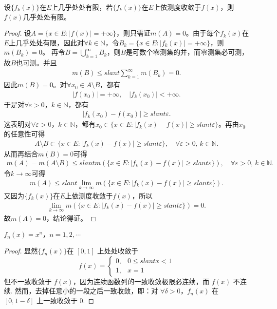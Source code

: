 \documentclass[../../main.tex]{subfiles}
\begin{document}
\begin{theorem}\label{theorem:依测度收敛的极限函数必几乎处处有限}
设\(\{f_k(x)\}\)在\(E\)上几乎处处有限，若\(\{f_k(x)\}\)在\(E\)上依测度收敛于\(f(x)\)，则\(f(x)\)几乎处处有限。
\end{theorem}
\begin{proof}
设\(A = \{x \in E : |f(x)| = +\infty\}\)，则只需证\(m(A) = 0\)。由于每个\(f_k(x)\)在\(E\)上几乎处处有限，因此对\(\forall k \in \mathbb{N}\)，令\(B_k = \{x \in E : |f_k(x)| = +\infty\}\)，则\(m(B_k) = 0\)。
再令\(B = \bigcup_{k=1}^{\infty} B_k\)，则\(B\)是可数个零测集的并，而零测集必可测，故\(B\)也可测。并且
\begin{align*}
m(B) \leqslant slant \sum_{k=1}^{\infty} m(B_k) = 0.
\end{align*}
因此\(m(B) = 0\)。对\(\forall x_0 \in A \setminus B\)，都有
\begin{align*}
|f(x_0)| = +\infty, \quad |f_k(x_0)| < +\infty.
\end{align*}
于是对\(\forall \varepsilon > 0\)，\(k \in \mathbb{N}\)，都有
\begin{align*}
|f_k(x_0) - f(x_0)| \geqslant slant \varepsilon.
\end{align*}
这表明对\(\forall \varepsilon > 0\)，\(k \in \mathbb{N}\)，都有\(x_0 \in \{x \in E : |f_k(x) - f(x)| \geqslant slant \varepsilon\}\)。再由\(x_0\)的任意性可得
\begin{align*}
A \setminus B \subset \{x \in E : |f_k(x) - f(x)| \geqslant slant \varepsilon\}, \quad \forall \varepsilon > 0, \, k \in \mathbb{N}.
\end{align*}
从而再结合\(m(B) = 0\)可得
\begin{align*}
m(A) = m(A \setminus B) \leqslant slant m(\{x \in E : |f_k(x) - f(x)| \geqslant slant \varepsilon\}), \quad \forall \varepsilon > 0, \, k \in \mathbb{N}.
\end{align*}
令\(k \to \infty\)可得
\begin{align*}
m(A) \leqslant slant \lim_{k \to \infty} m(\{x \in E : |f_k(x) - f(x)| \geqslant slant \varepsilon\}).
\end{align*}
又因为\(\{f_k(x)\}\)在\(E\)上依测度收敛于\(f(x)\)，所以
\begin{align*}
\lim_{k \to \infty} m(\{x \in E : |f_k(x) - f(x)| \geqslant slant \varepsilon\}) = 0.
\end{align*}
故\(m(A) = 0\)，结论得证。
\end{proof}

\begin{example}[收敛但不一致收敛的函数]

$f_n(x)=x^n$，$n = 1,2,\cdots$ 
\end{example}
\begin{proof}
显然$\{f_n(x)\}$在 $[0,1]$ 上处处收敛于
\[
f(x)=
\begin{cases}
0, & 0\leqslant slant x<1 \\
1, & x = 1
\end{cases}
\]
但不一致收敛于 $f(x)$，因为连续函数列的一致收敛极限必连续，而 $f(x)$ 不连续. 然而，去掉任意小的一段之后一致收敛，即：对 $\forall\delta>0$，$f_n(x)$ 在 $[0,1 - \delta]$ 上一致收敛于 $0$.
\end{proof}
\end{document}
